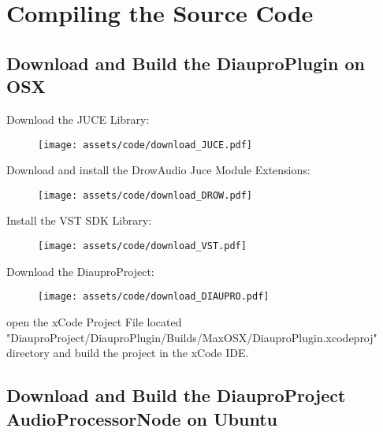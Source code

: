\section{Compiling the Source Code}

\subsection{Download and Build the DiauproPlugin on OSX}

Download the JUCE Library:
\vspace{-1em}
\begin{figure}[H]
    \centering
    \texttt{[image: assets/code/download\_JUCE.pdf]}
    \label{fig:juce}
    \vspace{-2.5em}
\end{figure}

\noindent
Download and install the DrowAudio Juce Module Extensions:
\vspace{-1em}
\begin{figure}[H]
    \centering
    \texttt{[image: assets/code/download\_DROW.pdf]}
    \label{fig:drow}
    \vspace{-2.5em}
\end{figure}
\noindent
Install the VST SDK Library:
\vspace{-1em}
\begin{figure}[H]
    \centering
    \texttt{[image: assets/code/download\_VST.pdf]}
    \label{fig:drow}
    \vspace{-2.5em}
\end{figure}
\noindent
Download the DiauproProject:
\vspace{-1em}
\begin{figure}[H]
    \centering
    \texttt{[image: assets/code/download\_DIAUPRO.pdf]}
    \label{fig:drow}
    \vspace{-2.5em}
\end{figure}
\noindent
open the xCode Project File located "DiauproProject/DiauproPlugin/Builds/MaxOSX/DiauproPlugin.xcodeproj" directory and
build the project in the xCode IDE.

\subsection{Download and Build the DiauproProject AudioProcessorNode on Ubuntu}

